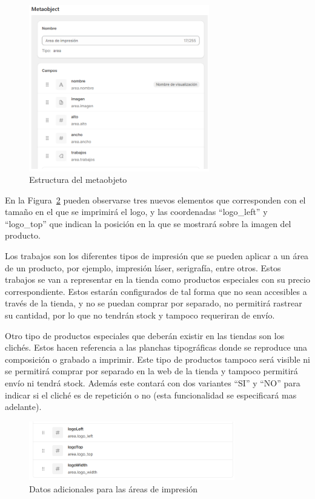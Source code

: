 \documentclass[11pt]{article}
\begin{document}
\begin{figure}[H]
    \centering
    \includegraphics[width=0.7\textwidth]{imagenesUS2/creacionMetaobjeto.png}
    \caption{\label{fig:metaobjeto}Estructura del metaobjeto}
    \vspace{\fill}
\end{figure}

En la Figura~\ref{fig:metaobjetoAdicional} pueden observarse tres nuevos elementos que corresponden con el tamaño en el que se imprimirá el logo, y las coordenadas ``logo\_left'' 
y ``logo\_top'' que indican la posición en la que se mostrará sobre la imagen del producto.

Los trabajos son los diferentes tipos de impresión que se pueden aplicar a un área de un producto, por ejemplo, impresión láser, serigrafía, entre otros.
Estos trabajos se van a representar en la tienda como productos especiales con su precio correspondiente. Estos estarán configurados de tal forma que no sean accesibles a través de la tienda, y
no se puedan comprar por separado, no permitirá rastrear su cantidad, por lo que no tendrán stock y tampoco requeriran de envío.

Otro tipo de productos especiales que deberán existir en las tiendas son los clichés. Estos hacen referencia a las planchas tipográficas donde se reproduce una composición o grabado
a imprimir. Este tipo de productos tampoco será visible ni se permitirá comprar por separado en la web de la tienda y tampoco permitirá envío  ni tendrá stock.
Además este contará con dos variantes ``SI'' y ``NO'' para indicar si el cliché es de repetición o no (esta funcionalidad se especificará mas adelante).


\begin{figure}[H]
    \centering
    \includegraphics[width=0.8\textwidth]{imagenesUS2/elementosMetaobjectAdicionales.png}
    \caption{\label{fig:metaobjetoAdicional}Datos adicionales para las áreas de impresión}
    \vspace{\fill}
\end{figure}
\end{document}
